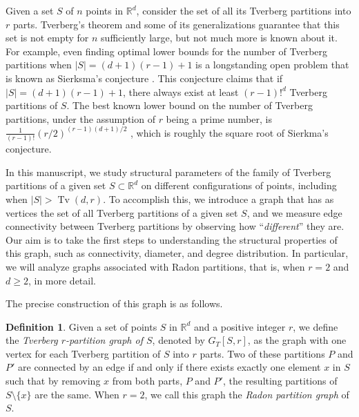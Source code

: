 \documentclass[11pt,a4paper]{article}
\theoremstyle{plain}
\theoremstyle{definition}
\newtheorem{definition}{Definition}
\newcommand{\rr}{\mathds{R}}
\newcommand{\tv}{\operatorname{Tv}}
\begin{document}
Given a set $S$ of $n$ points in $\rr^d$, consider the set of all its Tverberg partitions into $r$ parts.  Tverberg's theorem and some of its generalizations guarantee that this set is not empty for $n$ sufficiently large, but not much more is known about it.  For example, even finding optimal lower bounds for the number 
of Tverberg partitions when $|S|=(d+1)(r-1)+1$ is a longstanding open problem that is known as Sierksma's conjecture \cite{Sierksma1979}. This conjecture claims that if $|S|=(d+1)(r-1)+1$, there always exist at least $(r-1)!^d$ Tverberg partitions of $S$.  The best known lower bound on the number of Tverberg partitions, under the assumption of $r$ being a prime number, is $\frac{1}{(r-1)!}(r/2)^{(r-1)(d+1)/2}$  \cite{Vucic:1993be}, which is roughly the square root of Sierkma's conjecture.

In this manuscript, we study structural parameters of the family of Tverberg partitions of a given set $S \subset \rr^d$ on different configurations of points, including when $|S| > \tv(d,r)$. To accomplish this, we introduce a graph that has as vertices the set of all Tverberg partitions of a given set $S$, and we measure edge connectivity between Tverberg partitions by observing how ``\emph{different}'' they are. Our aim is to take the first steps to understanding the structural properties of this graph, such as connectivity, diameter, and degree distribution. In particular, we will analyze graphs associated with Radon partitions, that is, when $r=2$ and $d\geq 2$, in more detail. 

The precise construction of this graph is as follows. %

\begin{definition}\label{def-TverbergGraph}
Given a set of points $S$ in $\rr^d$ and a positive integer $r$, we define the \emph{Tverberg $r$-partition graph of $S$}, denoted by $G_{T}[S,r]$, as the graph with one vertex for each Tverberg partition of $S$ into $r$ parts.  Two of these partitions $P$ and $P'$ are connected by an edge if and only if there exists exactly one element $x$ in $S$ such that by removing $x$ from both parts, $P$ and $P'$, the resulting partitions of $S\setminus \{x\}$ are the same. When $r=2$, we call this graph the \emph{Radon partition graph} of $S$.
\end{definition}
\end{document}

